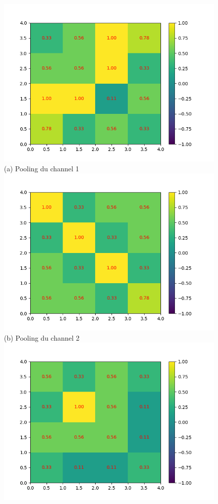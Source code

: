 \begin{figure}[h]
        \includegraphics[width=\textwidth]{img/cnn_exemple/cross/stride_1_max.png}
        \center 
        (a) Pooling du channel 1
    \endminipage\hfill
        \includegraphics[width=\textwidth]{img/cnn_exemple/cross/stride_2_max.png}
        \center 
        (b) Pooling du channel 2
    \endminipage\hfill
        \includegraphics[width=\textwidth]{img/cnn_exemple/cross/stride_3_max.png}

\end{figure}
